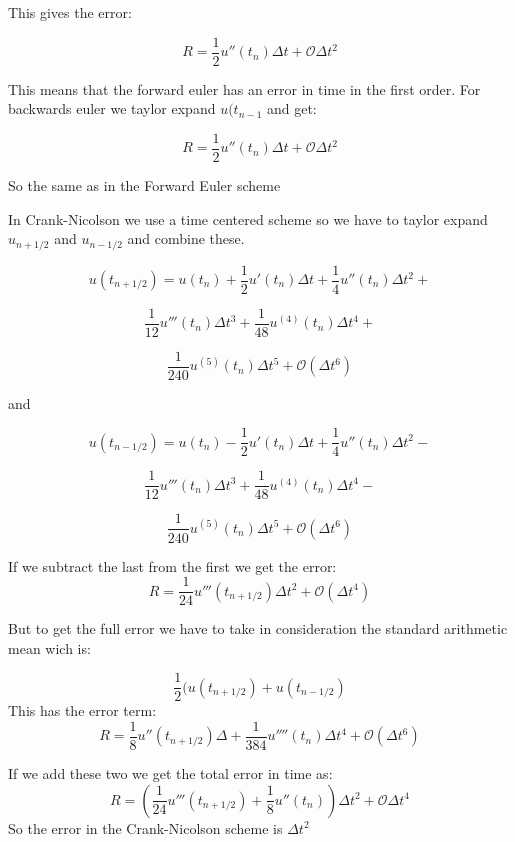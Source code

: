 \documentclass[a4paper,10pt]{article}
\begin{document}
This gives the error:

\begin{equation}
 R = \frac{1}{2}u''(t_n)\Delta t + \mathcal{O}\Delta t^2
\end{equation}

This means that the forward euler has an error in time in the first order. 
For backwards euler we taylor expand $u(t_{n-1}$ and get:

\begin{equation}
  R = \frac{1}{2}u''(t_n)\Delta t + \mathcal{O}\Delta t^2
\end{equation}

So the same as in the Forward Euler scheme

In Crank-Nicolson we use a time centered scheme so we have to taylor expand $u_{n+ 1/2}$ and $u_{n-1/2}$ and combine these. 

\[u(t_{n+1/2}) = u(t_n) + \frac{1}{2} u'(t_n)\Delta t + \frac{1}{4} u''(t_n) \Delta t^2 + \]

\[ \frac{1}{12}u'''(t_n) \Delta t^3 + \frac{1}{48} u^{(4)}(t_n)\Delta t^4 + \]

\[ \frac{1}{240} u^{(5)} (t_n) \Delta t^5 + \mathcal{O}(\Delta t^6) \]

and

\[ u(t_{n-1/2}) = u(t_n) - \frac{1}{2} u'(t_n)\Delta t + \frac{1}{4} u''(t_n) \Delta t^2 - \]

\[  \frac{1}{12}u'''(t_n) \Delta t^3 + \frac{1}{48} u^{(4)}(t_n)\Delta t^4 - \]

\[  \frac{1}{240} u^{(5)} (t_n) \Delta t^5 + \mathcal{O}(\Delta t^6) \]


If we subtract the last from the first we get the error:
\begin{equation}
 R = \frac{1}{24}u'''(t_{n+1/2})\Delta t^2 + \mathcal{O}(\Delta t^4)
\end{equation}

But to get the full error we have to take in consideration the standard arithmetic mean wich is:

\begin{equation}
 \frac{1}{2}(u(t_{n+1/2}) + u(t_{n - 1/2}) 
\end{equation}
This has the error term:
\begin{equation}
 R = \frac{1}{8}u''(t_{n+1/2})\Delta + \frac{1}{384}u''''(t_n)\Delta t^4 + \mathcal{O}(\Delta t^6)
\end{equation}

If we add these two we get the total error in time as:
\begin{equation}
 R = (\frac{1}{24} u'''(t_{n+1/2}) + \frac{1}{8}u''(t_n)) \Delta t^2 + \mathcal{O}\Delta t^4 
\end{equation}
So the error in the Crank-Nicolson scheme is $\Delta t^2$
\end{document}
